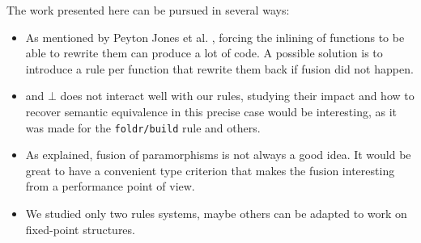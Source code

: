 
The work presented here can be pursued in several ways: 
\begin{itemize}
\item As mentioned by Peyton Jones et al. \cite{pbr}, forcing the inlining of functions to be able to rewrite them can produce a lot of code. A possible solution is to introduce a rule per function that rewrite them back if fusion did not happen.

\item {} and $\bot$ does not interact well with our rules, studying their impact and how to recover semantic equivalence in this precise case would be interesting, as it was made for the \verb|foldr/build| rule and others.

\item As explained, fusion of paramorphisms is not always a good idea. It would be great to have a convenient type criterion that makes the fusion interesting from a performance point of view.

\item We studied only two rules systems, maybe others can be adapted to work on fixed-point structures.
\end{itemize}